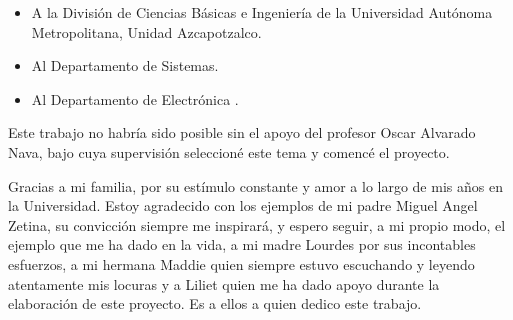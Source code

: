 

\begin{itemize}
 \item A la División de Ciencias Básicas e Ingeniería de la Universidad Autónoma
Metropolitana, Unidad Azcapotzalco.
 \item Al Departamento de Sistemas.
 \item Al Departamento de Electrónica .
\end{itemize}


Este trabajo no habría sido posible sin el apoyo del profesor
Oscar Alvarado Nava, bajo cuya supervisión seleccioné este tema y comencé el
proyecto. 

Gracias a mi familia, por su  estímulo constante y amor a lo largo de mis años en la Universidad.
Estoy agradecido con los ejemplos de mi padre Miguel Angel Zetina, su convicción siempre
me inspirará, y espero seguir, a mi propio modo, el ejemplo que me ha dado en la vida, a mi 
madre Lourdes por sus incontables esfuerzos, a mi hermana Maddie quien siempre estuvo
escuchando y leyendo atentamente mis locuras y a Liliet quien me ha dado apoyo  durante la
elaboración de este proyecto. Es a ellos a quien dedico este trabajo.
